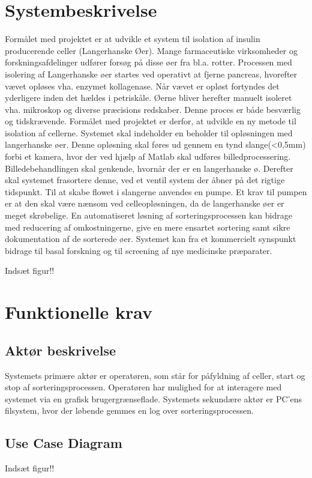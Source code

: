 \section{Systembeskrivelse}
Formålet med projektet er at udvikle et system til isolation af insulin producerende celler (Langerhanske Øer). Mange farmaceutiske virksomheder og forskningsafdelinger udfører forsøg på disse øer fra bl.a. rotter. Processen med isolering af Langerhanske øer startes ved operativt at fjerne pancreas, hvorefter vævet opløses vha. enzymet kollagenase. Når vævet er opløst fortyndes det yderligere inden det hældes i petriskåle. Øerne bliver herefter manuelt isoleret vha. mikroskop og diverse præcisions redskaber. Denne proces er både besværlig og tidskrævende. Formålet med projektet er derfor, at udvikle en ny metode til isolation af cellerne. Systemet skal indeholder en beholder til opløsningen med langerhanske øer. Denne opløsning skal føres ud gennem en tynd slange(<0,5mm)  forbi et kamera, hvor der ved hjælp af Matlab skal udføres billedprocessering. Billedebehandlingen skal genkende, hvornår der er en langerhanske ø. Derefter skal systemet frasortere denne, ved et ventil system der åbner på det rigtige tidspunkt. Til at skabe flowet i slangerne anvendes en pumpe.  Et krav til pumpen er at den skal være nænsom ved celleopløsningen, da de langerhanske øer er meget skrøbelige.
En automatiseret løsning af sorteringsprocessen kan bidrage med reducering af omkostningerne, give en mere ensartet sortering samt sikre dokumentation af de sorterede øer. Systemet kan fra et kommercielt synspunkt bidrage til basal forskning og til screening af nye medicinske præparater.

Indsæt figur!!
\section{Funktionelle krav}
\subsection{Aktør beskrivelse}
Systemets primære aktør er operatøren, som står for påfyldning af celler, start og stop af sorteringsprocessen. Operatøren har mulighed for at interagere med systemet via en grafisk brugergrænseflade. Systemets sekundære aktør er PC’ens filsystem, hvor der løbende gemmes en log over sorteringsprocessen.
\subsection{Use Case Diagram}
Indsæt figur!!
%





